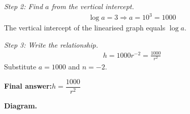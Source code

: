 \documentclass[11pt]{article}
\begin{document}
\textit{Step 2: Find \( a \) from the vertical intercept.}
\[\begin{gathered}
\log a = 3 \Rightarrow a = 10^3 = 1000
\end{gathered}\]
The vertical intercept of the linearised graph equals \( \log a \).

\textit{Step 3: Write the relationship.}
\[\begin{gathered}
h = 1000r^{-2} = \frac{1000}{r^2}
\end{gathered}\]
Substitute \( a = 1000 \) and \( n = -2 \).

\begin{answerbox}
\textbf{Final answer:}\quad \(\displaystyle  h = \dfrac{1000}{r^2} \)
\end{answerbox}
\textbf{Diagram.}

\begin{center}
\end{center}
\end{document}
